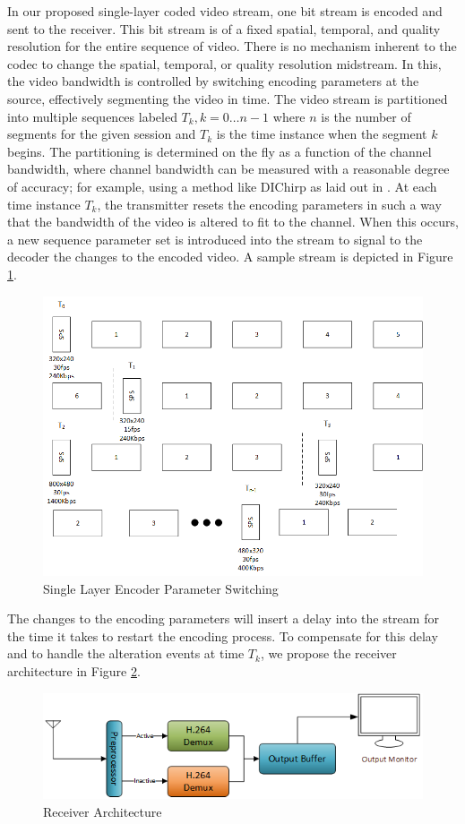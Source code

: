In our proposed single-layer coded video stream, one bit stream is encoded and sent to the receiver. This bit stream is of a fixed spatial, temporal, and quality resolution for the entire sequence of video. There is no mechanism inherent to the codec to change the spatial, temporal, or quality resolution midstream. In this, the video bandwidth is controlled by switching encoding parameters at the source, effectively segmenting the video in time. The video stream is partitioned into multiple sequences labeled $T_k,k=0\ldots{n-1}$ where $n$ is the number of segments for the given session and $T_k$ is the time instance when the segment $k$ begins. The partitioning is determined on the fly as a function of the channel bandwidth, where channel bandwidth can be measured with a reasonable degree of accuracy; for example, using a method like DIChirp as laid out in \cite{DIChirp}. At each time instance $T_k$, the transmitter resets the encoding parameters in such a way that the bandwidth of the video is altered to fit to the channel. When this occurs, a new sequence parameter set is introduced into the stream to signal to the decoder the changes to the encoded video. A sample stream is depicted in Figure \ref{fig:SingleLayerSwitching}.
\begin{figure}[ht]
\centering
\includegraphics[width=0.75\linewidth]{images/SingleLayerParameterSwitching.png}
\caption{Single Layer Encoder Parameter Switching}
\label{fig:SingleLayerSwitching}
\end{figure}
The changes to the encoding parameters will insert a delay into the stream for the time it takes to restart the encoding process. To compensate for this delay and to handle the alteration events at time $T_k$, we propose the receiver architecture in Figure \ref{fig:ReceiverArchitecture}.
\begin{figure}[ht]
\centering
\includegraphics[width=0.6\linewidth]{images/ReceiverArchitecture.png}
\caption{Receiver Architecture}
\label{fig:ReceiverArchitecture}
\end{figure}

